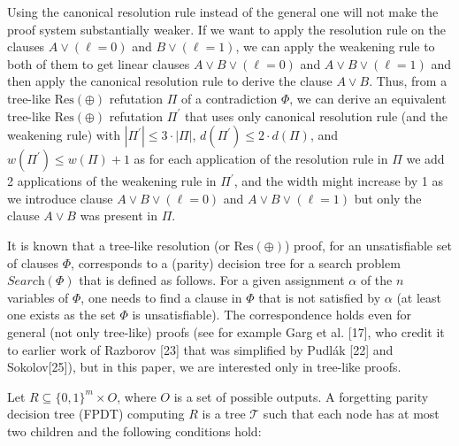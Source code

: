 Using the canonical resolution rule instead of the general one will not make the proof system substantially weaker.
If we want to apply the resolution rule on the clauses $A\vee(\ell=0)$ and $B\vee(\ell=1)$, we can apply the weakening rule to both of them to get linear clauses $A\vee B\vee(\ell=0)$ and $A\vee B\vee(\ell=1)$ and then apply the canonical resolution rule to derive the clause $A\vee B$.
Thus, from a tree-like $\text{Res}(\oplus)$ refutation $\Pi$ of a contradiction $\Phi$, we can derive an equivalent tree-like $\text{Res}(\oplus)$ refutation $\Pi^{\prime}$ that uses only canonical resolution rule (and the weakening rule) with $|\Pi^{\prime}|\leq 3\cdot|\Pi|$, $d(\Pi^{\prime})\leq 2\cdot d(\Pi)$, and $w(\Pi^{\prime})\leq w(\Pi)+1$ as for each application of the resolution rule in $\Pi$ we add 2 applications of the weakening rule in $\Pi^{\prime}$, and the width might increase by 1 as we introduce clause $A\vee B\vee(\ell=0)$ and $A\vee B\vee(\ell=1)$ but only the clause $A\vee B$ was present in $\Pi$.\par




It is known that a tree-like resolution (or $\text{Res}(\oplus)$) proof, for an unsatisfiable set of clauses $\Phi$, corresponds to a (parity) decision tree for a search problem $\textit{Search}(\Phi)$
that is defined as follows.
For a given assignment $\alpha$ of the $n$ variables of $\Phi$, one needs to find a clause in $\Phi$ that is not satisfied by $\alpha$ (at least one exists as the set $\Phi$ is unsatisfiable).
The correspondence holds even for general (not only tree-like) proofs
(see for example Garg et al. [17], who credit it to earlier work of Razborov [23] that was simplified by Pudlák [22] and Sokolov[25]), but in this paper, we are interested only in tree-like proofs.\par




Let $R\subseteq\{0,1\}^{m}\times O$, where $O$ is a set of possible outputs.
A forgetting parity decision tree (FPDT) computing $R$ is a tree $\mathcal{T}$ such that each node has at most two children and the following conditions hold:\par


